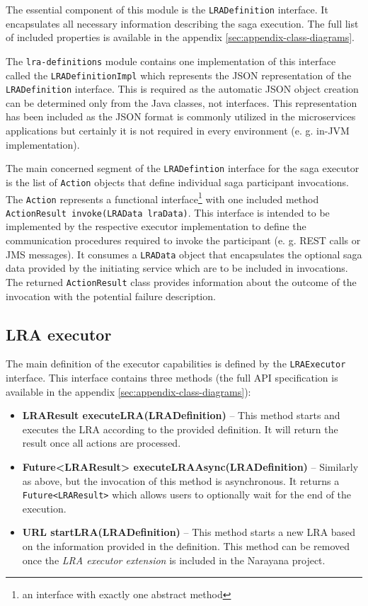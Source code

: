 \documentclass[oneside,
  digital, %
  table,   %
  lof,     %
  lot,     %
]{fithesis3}
\begin{document}
The essential component of this module is the \texttt{LRADefinition} interface. It encapsulates all necessary information describing the saga execution. The full list of included properties is available in the appendix \ref{sec:appendix-class-diagrams}. 

The \texttt{lra-definitions} module contains one implementation of this interface called the \texttt{LRADefinitionImpl} which represents the JSON representation of the \texttt{LRADefinition} interface. This is required as the automatic JSON object creation can be determined only from the Java classes, not interfaces. This representation has been included as the JSON format is commonly utilized in the microservices applications but certainly it is not required in every environment (e. g. in-JVM implementation).

The main concerned segment of the \texttt{LRADefintion} interface for the saga executor is the list of \texttt{Action} objects that define individual saga participant invocations. The \texttt{Action} represents a functional interface\footnote{an interface with exactly one abstract method} with one included method \texttt{ActionResult invoke(LRAData lraData)}. This interface is intended to be implemented by the respective executor implementation to define the communication procedures required to invoke the participant (e. g. REST calls or JMS messages). It consumes a \texttt{LRAData} object that encapsulates the optional saga data provided by the initiating service which are to be included in invocations. The returned \texttt{ActionResult} class provides information about the outcome of the invocation with the potential failure description.

\subsection{LRA executor}

The main definition of the executor capabilities is defined by the \texttt{LRAExecutor} interface. This interface contains three methods (the full API specification is available in the appendix \ref{sec:appendix-class-diagrams}):

\begin{itemize}
    \item \textbf{LRAResult executeLRA(LRADefinition)} -- This method starts and executes the LRA according to the provided definition. It will return the result once all actions are processed.
    
    \item \textbf{Future<LRAResult> executeLRAAsync(LRADefinition)} -- Similarly as above, but the invocation of this method is asynchronous. It returns a \texttt{Future<LRAResult>} which allows users to optionally wait for the end of the execution.
    
    \item \textbf{URL startLRA(LRADefinition)} -- This method starts a new LRA based on the information provided in the definition. This method can be removed once the \textit{LRA executor extension} is included in the Narayana project.
\end{itemize}
\end{document}
